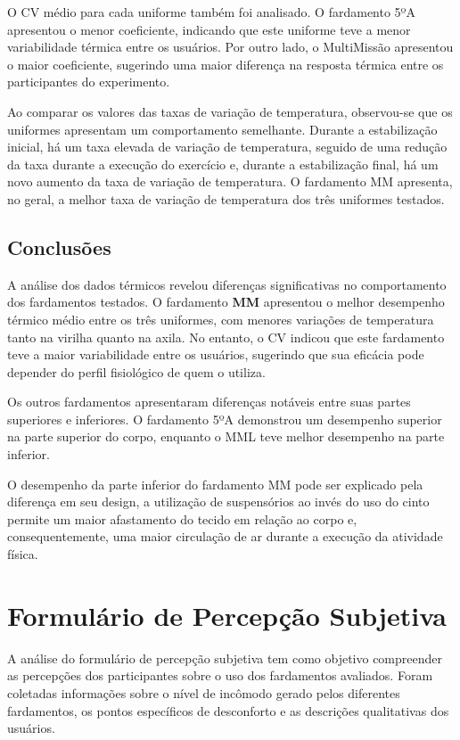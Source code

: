             O \acrlong{CV} médio para cada uniforme também foi analisado. O fardamento 5ºA apresentou 
            o menor coeficiente, indicando que este uniforme teve a menor variabilidade térmica entre 
            os usuários. Por outro lado, o MultiMissão apresentou o maior coeficiente, sugerindo uma 
            maior diferença na resposta térmica entre os participantes do experimento.

        Ao comparar os valores das taxas de variação de temperatura, observou-se que os 
        uniformes apresentam um comportamento semelhante. Durante a estabilização inicial, há um 
        taxa elevada de variação de temperatura, seguido de uma redução da taxa durante a execução do exercício 
        e, durante a estabilização final, há um novo aumento da taxa de variação de temperatura. 
        O fardamento \acrshort{MM} apresenta, no geral, a melhor taxa de variação de temperatura 
        dos três uniformes testados.

    \subsection{Conclusões}
        A análise dos dados térmicos revelou diferenças significativas no comportamento dos 
        fardamentos testados. O fardamento \textbf{\acrlong{MM}} apresentou o melhor desempenho térmico 
        médio entre os três uniformes, com menores variações de temperatura tanto na virilha quanto na 
        axila. No entanto, o \acrshort{CV} indicou que este fardamento teve a maior variabilidade 
        entre os usuários, sugerindo que sua eficácia pode depender do perfil fisiológico de quem o 
        utiliza.
        
        Os outros fardamentos apresentaram diferenças notáveis entre suas partes superiores e inferiores. 
        O fardamento 5ºA demonstrou um desempenho superior na parte superior do corpo, enquanto o 
        \acrlong{MML} teve melhor desempenho na parte inferior. 
        
        O desempenho da parte inferior do fardamento \acrshort{MM} pode ser explicado pela 
        diferença em seu design, a utilização de suspensórios ao invés do uso do cinto permite um maior 
        afastamento do tecido em relação ao corpo e, consequentemente, uma maior circulação de ar 
        durante a execução da atividade física.


\section{Formulário de Percepção Subjetiva}
A análise do formulário de percepção subjetiva tem como objetivo compreender as percepções dos 
participantes sobre o uso dos fardamentos avaliados. Foram coletadas informações sobre o nível de 
incômodo gerado pelos diferentes fardamentos, os pontos específicos de desconforto e as descrições 
qualitativas dos usuários.

